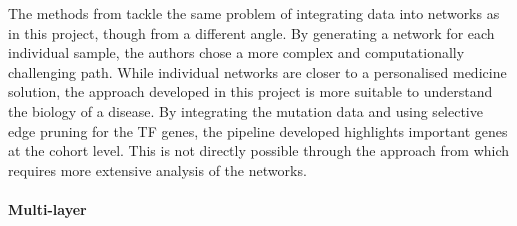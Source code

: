 The methods from \citet{Hofree2013-ld, He2017-dj} tackle the same problem of integrating data into networks as in this project, though from a different angle. By generating a network for each individual sample, the authors chose a more complex and computationally challenging path. While individual networks are closer to a personalised medicine solution, the approach developed in this project is more suitable to understand the biology of a disease. By integrating the mutation data and using selective edge pruning for the TF genes, the pipeline developed highlights important genes at the cohort level. This is not directly possible through the approach from \citet{Hofree2013-ld, He2017-dj} which requires more extensive analysis of the networks.



\paragraph*{Multi-layer} \label{s:lit:multi-layer}

